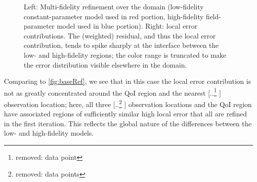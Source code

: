 \documentclass[review]{siamart0516}
\providecommand{\DIFaddtex}[1]{{\protect\color{blue} \sf #1}} %
\providecommand{\DIFdeltex}[1]{{\protect\color{red} [..\footnote{removed: #1} ]}} %
\providecommand{\DIFaddbegin}{} %
\providecommand{\DIFaddend}{} %
\providecommand{\DIFdelbegin}{} %
\providecommand{\DIFdelend}{} %
\providecommand{\DIFadd}[1]{\texorpdfstring{\DIFaddtex{#1}}{#1}} %
\providecommand{\DIFdel}[1]{\texorpdfstring{\DIFdeltex{#1}}{}} %
\newcommand{\DIFscaledelfig}{0.5}
\newlength{\DIFdelgraphicswidth} %
\newlength{\DIFdelgraphicsheight} %
\newcommand{\DIFaddincludegraphics}[2][]{{\color{blue}\fbox{\DIFOincludegraphics[#1]{#2}}}} %
\newcommand{\DIFdelincludegraphics}[2][]{%
\sbox{\DIFdelgraphicsbox}{\DIFOincludegraphics[#1]{#2}}%
\settoboxwidth{\DIFdelgraphicswidth}{\DIFdelgraphicsbox} %
\settoboxtotalheight{\DIFdelgraphicsheight}{\DIFdelgraphicsbox} %
\scalebox{\DIFscaledelfig}{%
\parbox[b]{\DIFdelgraphicswidth}{\usebox{\DIFdelgraphicsbox}\\[-\baselineskip] \rule{\DIFdelgraphicswidth}{0em}}\llap{\resizebox{\DIFdelgraphicswidth}{\DIFdelgraphicsheight}{%
\setlength{\unitlength}{\DIFdelgraphicswidth}%
\begin{picture}(1,1)%
\thicklines\linethickness{2pt} %
{\color[rgb]{1,0,0}\put(0,0){\framebox(1,1){}}}%
{\color[rgb]{1,0,0}\put(0,0){\line( 1,1){1}}}%
{\color[rgb]{1,0,0}\put(0,1){\line(1,-1){1}}}%
\end{picture}%
}\hspace*{3pt}}} %
} %
\DeclareRobustCommand{\DIFaddbegin}{\DIFOaddbegin \let\includegraphics\DIFaddincludegraphics} %
\DeclareRobustCommand{\DIFaddend}{\DIFOaddend \let\includegraphics\DIFOincludegraphics} %
\DeclareRobustCommand{\DIFdelbegin}{\DIFOdelbegin \let\includegraphics\DIFdelincludegraphics} %
\DeclareRobustCommand{\DIFdelend}{\DIFOaddend \let\includegraphics\DIFOincludegraphics} %
\begin{document}
\begin{figure}[htbp]
\caption{Left: Multi-fidelity refinement over the domain (low-fidelity constant-parameter model used in red portion, high-fidelity field-parameter model used in blue portion). Right: local error contributions. The (weighted) residual, and thus the local error contribution, tends to spike sharply at the interface between the low- and high-fidelity regions; the color range is truncated to make the error distribution visible elsewhere in the domain.}
\label{fig:svfRef}
\end{figure}
%
Comparing to \cref{fig:baseRef}, we see that in this case the local error contribution is not as greatly concentrated around the QoI region and the nearest \DIFdelbegin \DIFdel{data point}\DIFdelend \DIFaddbegin \DIFadd{observation location}\DIFaddend ; here, all three \DIFdelbegin \DIFdel{data points }\DIFdelend \DIFaddbegin \DIFadd{observation locations }\DIFaddend and the QoI region have associated regions of sufficiently similar high local error that all are refined in the first iteration. This reflects the global nature of the differences between the low- and high-fidelity models. 
\end{document}

